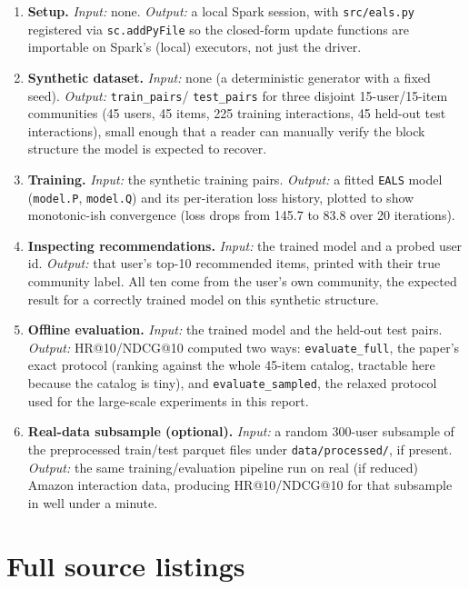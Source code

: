 \begin{enumerate}
  \item \textbf{Setup.} \emph{Input:} none. \emph{Output:} a local Spark
        session, with \texttt{src/eals.py} registered via
        \texttt{sc.addPyFile} so the closed-form update functions are
        importable on Spark's (local) executors, not just the driver.
  \item \textbf{Synthetic dataset.} \emph{Input:} none (a deterministic
        generator with a fixed seed). \emph{Output:} \texttt{train\_pairs}/
        \texttt{test\_pairs} for three disjoint 15-user/15-item
        communities (45 users, 45 items, 225 training interactions, 45
        held-out test interactions), small enough that a reader can
        manually verify the block structure the model is expected to
        recover.
  \item \textbf{Training.} \emph{Input:} the synthetic training pairs.
        \emph{Output:} a fitted \texttt{EALS} model
        (\texttt{model.P}, \texttt{model.Q}) and its per-iteration loss
        history, plotted to show monotonic-ish convergence (loss drops
        from 145.7 to 83.8 over 20 iterations).
  \item \textbf{Inspecting recommendations.} \emph{Input:} the trained
        model and a probed user id. \emph{Output:} that user's top-10
        recommended items, printed with their true community label. All
        ten come from the user's own community, the expected result
        for a correctly trained model on this synthetic structure.
  \item \textbf{Offline evaluation.} \emph{Input:} the trained model and
        the held-out test pairs. \emph{Output:} HR@10/NDCG@10 computed
        two ways: \texttt{evaluate\_full}, the paper's exact protocol
        (ranking against the whole 45-item catalog, tractable here because
        the catalog is tiny), and \texttt{evaluate\_sampled}, the
        relaxed protocol used for the large-scale experiments in this
        report.
  \item \textbf{Real-data subsample (optional).} \emph{Input:} a random
        300-user subsample of the preprocessed train/test parquet files
        under \texttt{data/processed/}, if present. \emph{Output:} the
        same training/evaluation pipeline
        run on real (if reduced) Amazon interaction data, producing
        HR@10/NDCG@10 for that subsample in well under a minute.
\end{enumerate}

\section{Full source listings}

